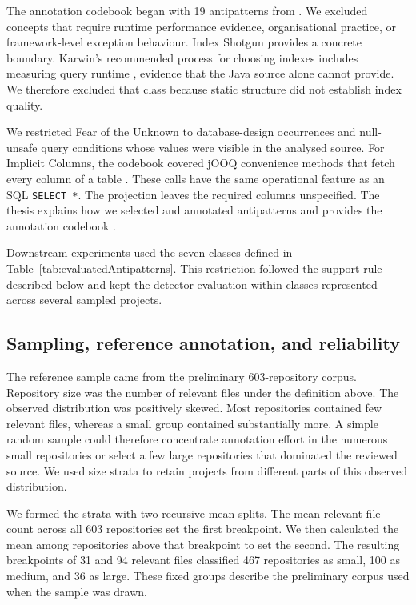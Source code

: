 The annotation codebook began with 19 antipatterns from . We excluded concepts that require runtime performance evidence, organisational practice, or framework-level exception behaviour. Index Shotgun provides a concrete boundary. Karwin's recommended process for choosing indexes includes measuring query runtime , evidence that the Java source alone cannot provide. We therefore excluded that class because static structure did not establish index quality.

We restricted Fear of the Unknown to database-design occurrences and null-unsafe query conditions whose values were visible in the analysed source. For Implicit Columns, the codebook covered jOOQ convenience methods that fetch every column of a table . These calls have the same operational feature as an SQL \texttt{SELECT *}. The projection leaves the required columns unspecified. The thesis explains how we selected and annotated antipatterns and provides the annotation codebook .

Downstream experiments used the seven classes defined in Table~\ref{tab:evaluatedAntipatterns}. This restriction followed the support rule described below and kept the detector evaluation within classes represented across several sampled projects.

\subsection{Sampling, reference annotation, and reliability}\label{sec:referenceAnnotations}

The reference sample came from the preliminary \num{603}-repository corpus. Repository size was the number of relevant files under the definition above. The observed distribution was positively skewed. Most repositories contained few relevant files, whereas a small group contained substantially more. A simple random sample could therefore concentrate annotation effort in the numerous small repositories or select a few large repositories that dominated the reviewed source. We used size strata to retain projects from different parts of this observed distribution.

We formed the strata with two recursive mean splits. The mean relevant-file count across all \num{603} repositories set the first breakpoint. We then calculated the mean among repositories above that breakpoint to set the second. The resulting breakpoints of \num{31} and \num{94} relevant files classified \num{467} repositories as small, \num{100} as medium, and \num{36} as large. These fixed groups describe the preliminary corpus used when the sample was drawn.


